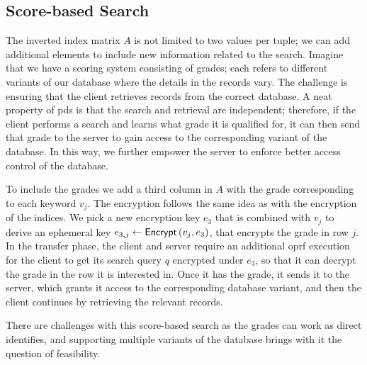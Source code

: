 \subsection*{\thesubsection\quad Score-based Search}\label{subsec:KeywordSearchScoreBased}

The inverted index matrix $ A $ is not limited to two values per tuple; we can add additional elements to include new information related to the search. Imagine that we have a scoring system consisting of  grades; each refers to different variants of our database where the details in the records vary. The challenge is ensuring that the client retrieves records from the correct database. A neat property of \acrshort{pds} is that the search and retrieval are independent; therefore, if the client performs a search and learns what grade it is qualified for, it can then send that grade to the server to gain access to the corresponding variant of the database. In this way, we further empower the server to enforce better access control of the database.

To include the grades we add a third column in $ A $ with the grade corresponding to each keyword $ v_j $. The encryption follows the same idea as with the encryption of the indices. We pick a new encryption key $ e_3 $ that is combined with $ v_j $ to derive an ephemeral key $ e_{3,j} \gets \mathsf{{Encrypt}}\left(v_j, e_3\right) $, that encrypts the grade in row $ j $. In the transfer phase, the client and server require an additional \acrshort{oprf} execution for the client to get its search query $ q $ encrypted under $ e_3 $, so that it can decrypt the grade in the row it is interested in. Once it has the grade, it sends it to the server, which grants it access to the corresponding database variant, and then the client continues by retrieving the relevant records.

There are challenges with this score-based search as the grades can work as direct identifies, and supporting multiple variants of the database brings with it the question of feasibility.
